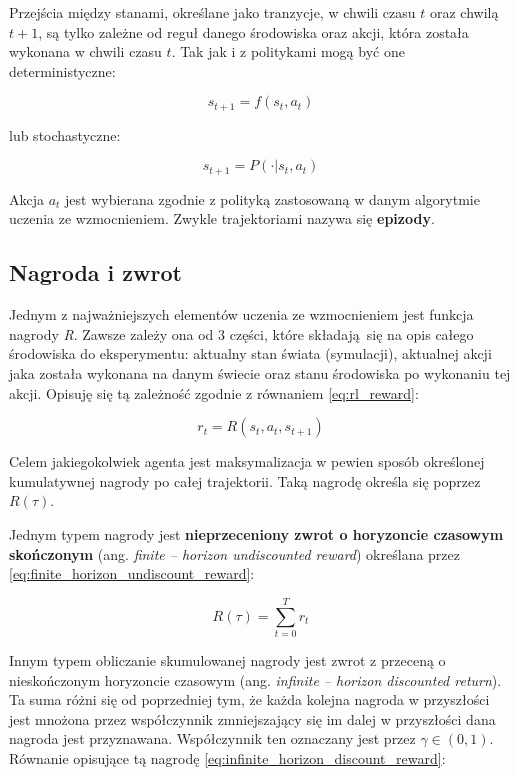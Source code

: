 Przejścia między stanami, określane jako tranzycje, w chwili czasu $t$ oraz 
chwilą $t+1$, są tylko zależne od reguł danego środowiska oraz akcji, która 
została wykonana w chwili czasu $t$. Tak jak i z politykami mogą być one 
deterministyczne:

\begin{equation}
	s_{t+1}=f(s_t, a_t)
\end{equation}

lub stochastyczne:

\begin{equation}
	s_{t+1}=P(\cdot|s_t, a_t)
\end{equation}

Akcja $a_t$ jest wybierana zgodnie z polityką zastosowaną w danym algorytmie 
uczenia ze wzmocnieniem. Zwykle trajektoriami nazywa się \textbf{epizody}.

\subsection{Nagroda i zwrot}

Jednym z najważniejszych elementów uczenia ze wzmocnieniem jest funkcja nagrody 
\textit{R}. Zawsze zależy ona od 3 części, które składają się na opis całego 
środowiska do eksperymentu: aktualny stan świata (symulacji), aktualnej akcji 
jaka została wykonana na danym świecie oraz stanu środowiska po wykonaniu tej 
akcji. Opisuję się tą zależność zgodnie z równaniem \ref{eq:rl_reward}:

\begin{equation}
	r_t=R(s_t, a_t, s_{t+1})
\end{equation}

Celem jakiegokolwiek agenta jest maksymalizacja w pewien sposób określonej 
kumulatywnej nagrody po całej trajektorii. Taką nagrodę określa się poprzez 
$R(\tau)$. 

Jednym typem nagrody jest \textbf{nieprzeceniony zwrot o horyzoncie czasowym 
skończonym} (ang. \textit{finite -- horizon undiscounted reward}) określana 
przez \ref{eq:finite_horizon_undiscount_reward}:

\begin{equation}
	R(\tau)=\sum_{t=0}^{T} r_t
	\label{eq:finite_horizon_undiscount_reward}
\end{equation}	

Innym typem obliczanie skumulowanej nagrody jest zwrot z przeceną o 
nieskończonym horyzoncie czasowym (ang. \textit{infinite -- horizon discounted 
return}). Ta suma różni się od poprzedniej tym, że każda kolejna nagroda w 
przyszłości jest mnożona przez współczynnik zmniejszający się im dalej w 
przyszłości dana nagroda jest przyznawana. Współczynnik ten oznaczany jest 
przez $\gamma\in(0, 1)$. Równanie opisujące tą nagrodę 
\ref{eq:infinite_horizon_discount_reward}:

